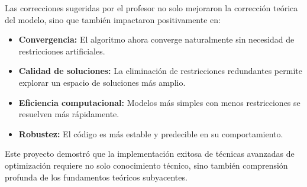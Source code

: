\documentclass[a4paper,12pt]{article}
\begin{document}
Las correcciones sugeridas por el profesor no solo mejoraron la corrección teórica del modelo, sino que también impactaron positivamente en:

\begin{itemize}
    \item \textbf{Convergencia:} El algoritmo ahora converge naturalmente sin necesidad de restricciones artificiales.
    \item \textbf{Calidad de soluciones:} La eliminación de restricciones redundantes permite explorar un espacio de soluciones más amplio.
    \item \textbf{Eficiencia computacional:} Modelos más simples con menos restricciones se resuelven más rápidamente.
    \item \textbf{Robustez:} El código es más estable y predecible en su comportamiento.
\end{itemize}

Este proyecto demostró que la implementación exitosa de técnicas avanzadas de optimización requiere no solo conocimiento técnico, sino también comprensión profunda de los fundamentos teóricos subyacentes.
\end{document}
